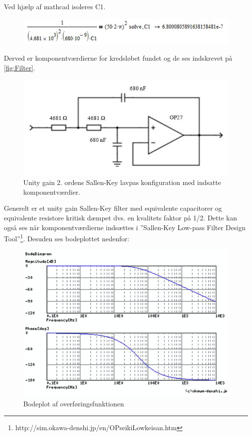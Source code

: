 Ved hjælp af mathcad isoleres C1. 

\begin{figure}[h]
	\centering
	\includegraphics[width=1\textwidth]{Figurer/ligning7}
	\label{fig:lign7}
\end{figure}

Derved er komponentværdierne for kredsløbet fundet og de ses indskrevet på \ref{fig:Filter}. 

\begin{figure}[h]
	\centering
	\includegraphics[width=1\textwidth]{Figurer/FilterDesignMedKomponentvaerdier}
	\caption{Unity gain 2. ordens Sallen-Key lavpas konfiguration med indsatte komponentværdier.}
	\label{fig:Filter_K}
\end{figure}

Generelt er et unity gain Sallen-Key filter med equivalente capacitorer og equivalente resistore kritisk dæmpet dvs. en kvalitets faktor på 1/2. Dette kan også ses når komponentværdierne indsættes i ”Sallen-Key Low-pass Filter Design Tool”\footnote{http://sim.okawa-denshi.jp/en/OPseikiLowkeisan.htm}. Desuden ses bodeplottet nedenfor:

\begin{figure}[h]
	\centering
	\includegraphics[width=1\textwidth]{Figurer/Bodeplot}
	\caption[]{Bodeplot af overføringsfunktionen\footnotemark}
	\label{fig:Bodeplot}
\end{figure}


